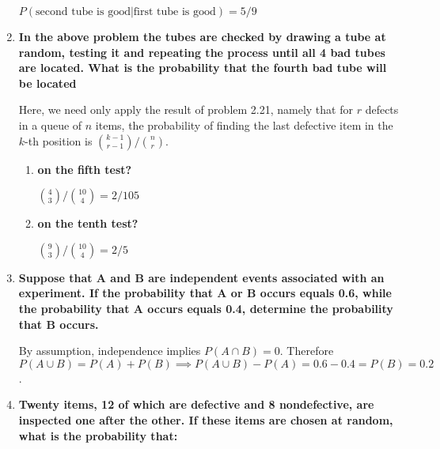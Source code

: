 \documentclass[10pt, oneside]{article}   	%
\theoremstyle{definition}
\begin{document}
\begin{enumerate}[label=3.\arabic*]
$P(\text{second tube is good} | \text{first tube is good}) = \boxed{5/9}$

\item  \begin{tcolorbox}[
  colback=Cerulean!5!white,
  colframe=Cerulean!75!black]
\textbf{In the above problem the tubes are checked by drawing a tube at random, testing it and repeating the process until all 4 bad tubes are located. What is the probability that the fourth bad tube will be located}
\end{tcolorbox}

Here, we need only apply the result of problem 2.21, namely that for $r$ defects in a queue of $n$ items, the probability of finding the last defective item in the $k$-th position is $\binom{k-1}{r-1} / \binom{n}{r}$.

	\begin{enumerate}
	\item  \begin{tcolorbox}[
	  colback=Cerulean!5!white,
	  colframe=Cerulean!75!black]
	\textbf{on the fifth test?}
	\end{tcolorbox}
	
	$\binom{4}{3} / \binom{10}{4} = \boxed{2/105}$
	
	\item  \begin{tcolorbox}[
	  colback=Cerulean!5!white,
	  colframe=Cerulean!75!black]
	\textbf{on the tenth test?}
	\end{tcolorbox}
	
	$\binom{9}{3} / \binom{10}{4} = \boxed{2/5}$
	
	\end{enumerate}

\item  \begin{tcolorbox}[
  colback=Cerulean!5!white,
  colframe=Cerulean!75!black]
\textbf{Suppose that $\bm{A}$ and $\bm{B}$ are independent events associated with an experiment. If the probability that $\bm{A}$ or $\bm{B}$ occurs equals 0.6, while the probability that $\bm{A}$ occurs equals 0.4, determine the probability that $\bm{B}$ occurs.}
\end{tcolorbox}

By assumption, independence implies $P(A \cap B) = 0$. Therefore $P(A \cup B) = P(A) + P(B) \implies P(A \cup B) - P(A) = 0.6 - 0.4 = \boxed{P(B) = 0.2}$.

\item  \begin{tcolorbox}[
  colback=Cerulean!5!white,
  colframe=Cerulean!75!black]
\textbf{Twenty items, 12 of which are defective and 8 nondefective, are inspected one after the other. If these items are chosen at random, what is the probability that:}
\end{tcolorbox}


\end{enumerate}
\end{document}
